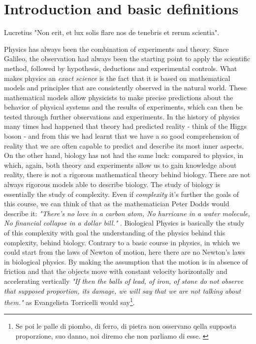 \documentclass[../main/main.tex]{subfiles}
\begin{document}
\chapter{Introduction and basic definitions}

\begin{chapquote}{Lucretius}
    "Non erit, et lux solis flare nos de tenebris et rerum scientia".
\end{chapquote}



Physics has always been the combination of experiments and theory. Since Galileo, the observation had always been the starting point to apply the scientific method, followed by hypothesis, deductions and experimental controls.  
What makes physics an \emph{exact science} is the fact that it is based on mathematical models and principles that are consistently observed in the natural world. These mathematical models allow physicists to make precise predictions about the behavior of physical systems and the results of experiments, which can then be tested through further observations and experiments.
In the history of physics many times had happened that theory had predicted reality - think of the Higgs boson - and from this we had learnt that we have a so good comprehension of reality that we are often capable to predict and describe its most inner aspects.
On the other hand, biology has not had the same luck: compared to physics, in which, again, both theory and experiments allow us to gain knowledge about reality, there is not a rigorous mathematical theory behind biology.
There are not always rigorous models able to describe biology. The study of biology is essentially the study of complexity.
Even if \emph{complexity} it's further the goals of this course, we can think of that as the mathematician Peter Dodds would describe it: \emph{"There's no love in a carbon atom, No hurricane in a water molecule, No financial collapse in a dollar bill."} \cite{complexity}.
Biological Physics is basically the study of this complexity with goal the understanding of the physics behind this complexity, behind biology. 
Contrary to a basic course in physics, in which we could start from the laws of Newton of motion, here there are no Newton's laws in biological physics. By making the assumption that the motion is in absence of friction and that the objects move with constant velocity horizontally and accelerating vertically \emph{"If then the balls of lead, of iron, of stone do not observe that supposed proportion, its damage, we will say that we are not talking about them."} as Evangelista Torricelli would say\footnote{Se poi le palle di piombo, di ferro, di pietra non osservano qella supposta proporzione, suo danno, noi diremo che non parliamo di esse. \cite{E-Torricelli}}.
\end{document}
